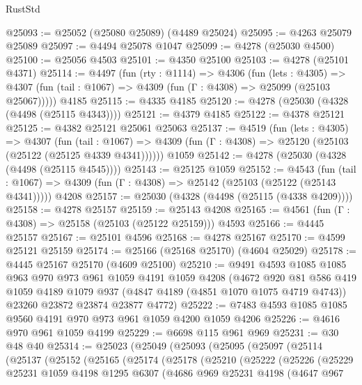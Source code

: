 \begin{lexlean}{RustStd}
\begin{coremodule}
@25093 := @25052 (@25080 @25089) (@4489 @25024)
@25095 := @4263 @25079 @25089
@25097 := @4494 @25078 @1047
@25099 := @4278 (@25030 @4500)
@25100 := @25056 @4503
@25101 := @4350 @25100
@25103 := @4278 (@25101 @4371)
@25114 := @4497
    (fun (rty : @1114) =>
    @4306
      (fun (lets : @4305) =>
      @4307 (fun (tail : @1067) => @4309 (fun (Γ : @4308) => @25099 (@25103 @25067)))))
    @4185
@25115 := @4335 @4185
@25120 := @4278 (@25030 (@4328 (@4498 (@25115 @4343))))
@25121 := @4379 @4185
@25122 := @4378 @25121
@25125 := @4382 @25121 @25061 @25063
@25137 := @4519
    (fun (lets : @4305) =>
    @4307
      (fun (tail : @1067) =>
      @4309 (fun (Γ : @4308) => @25120 (@25103 (@25122 (@25125 @4339 @4341))))))
    @1059
@25142 := @4278 (@25030 (@4328 (@4498 (@25115 @4545))))
@25143 := @25125 @1059
@25152 := @4543
    (fun (tail : @1067) => @4309 (fun (Γ : @4308) => @25142 (@25103 (@25122 (@25143 @4341)))))
    @4208
@25157 := @25030 (@4328 (@4498 (@25115 (@4338 @4209))))
@25158 := @4278 @25157
@25159 := @25143 @4208
@25165 := @4561 (fun (Γ : @4308) => @25158 (@25103 (@25122 @25159))) @4593
@25166 := @4445 @25157
@25167 := @25101 @4596
@25168 := @4278 @25167
@25170 := @4599 @25121 @25159
@25174 := @25166 (@25168 @25170) (@4604 @25029)
@25178 := @4445 @25167 @25170 (@4609 @25100)
@25210 := @9491
    @4593
    @1085
    @1085
    @963
    @970
    @973
    @961
    @1059
    @4191
    @1059
    @4208
    (@4672
      @920
      @81
      @586
      @419
      @1059
      @4189
      @1079
      @937
      (@4847 @4189 (@4851 @1070 @1075 @4719 @4743))
      @23260
      @23872
      @23874
      @23877
      @4772)
@25222 := @7483 @4593 @1085 @1085 @9560 @4191 @970 @973 @961 @1059 @4200 @1059 @4206
@25226 := @4616 @970 @961 @1059 @4199
@25229 := @6698 @115 @961 @969
@25231 := @30 @48 @40
@25314 := @25023
    (@25049
      (@25093
        (@25095
          (@25097
            (@25114
              (@25137
                (@25152
                  (@25165
                    (@25174
                      (@25178
                        (@25210
                          (@25222
                            (@25226
                              (@25229
                                @25231
                                @1059
                                @4198
                                @1295
                                @6307
                                (@4686
                                  @969
                                  @25231
                                  @4198
                                  (@4647
                                    @967

\end{coremodule}
\end{lexlean}
